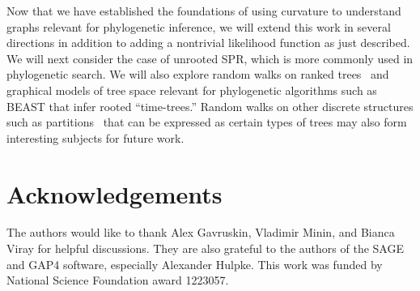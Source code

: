 \documentclass[11pt,onecolumn,conference]{IEEEtran}
\begin{document}
Now that we have established the foundations of using curvature to understand graphs relevant for phylogenetic inference, we will extend this work in several directions in addition to adding a nontrivial likelihood function as just described.
We will next consider the case of unrooted SPR, which is more commonly used in phylogenetic search.
We will also explore random walks on ranked trees~\cite{Song2006-xe} and graphical models of tree space relevant for phylogenetic algorithms such as BEAST \cite{Drummond2012-ek} that infer rooted ``time-trees.''
Random walks on other discrete structures such as partitions~\cite{Gusfield2002-il} that can be expressed as certain types of trees may also form interesting subjects for future work.


\section{Acknowledgements}
The authors would like to thank Alex Gavruskin, Vladimir Minin, and Bianca Viray for helpful discussions.
They are also grateful to the authors of the SAGE and GAP4 software, especially Alexander Hulpke.
This work was funded by National Science Foundation award 1223057.

\pagebreak



\end{document}
